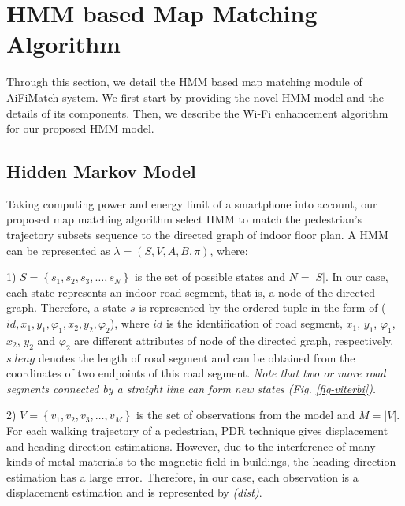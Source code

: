 \documentclass{llncs}
\begin{document}
\section{HMM based Map Matching Algorithm}

Through this section, we detail the HMM based map matching module of AiFiMatch system. We first start by providing the novel HMM model and the details of its components. Then, we describe the Wi-Fi enhancement algorithm for our proposed HMM model.

\subsection{Hidden Markov Model}

Taking computing power and energy limit of a smartphone into account, our proposed map matching algorithm select HMM to match the pedestrian's trajectory subsets sequence to the directed graph of indoor floor plan. A HMM can be represented as $\lambda  = (S,V,A,B,\pi)$, where:

1) $S = \left\{ {{s_1},{s_2},{s_3}, \ldots ,{s_N}} \right\}$ is the set of possible states and $N = \left| S \right|$. In our case, each state represents an indoor road segment, that is, a node of the directed graph. Therefore, a state $s$ is represented by the ordered tuple in the form of ($id,x_{1},y_{1},{\varphi}_{1},x_{2},y_{2},{\varphi}_{2}$), where $id$ is the identification of road segment, $x_{1}$, $y_{1}$, ${\varphi}_{1}$, $x_{2}$, $y_{2}$ and ${\varphi}_{2}$ are different attributes of node of the directed graph, respectively. $s.leng$ denotes the length of road segment and can be obtained from the coordinates of two endpoints of this road segment. \emph{Note that two or more road segments connected by a straight line can form new states (Fig. \ref{fig-viterbi}).}

2) $V = \left\{ {{v_1},{v_2},{v_3}, \ldots ,{v_M}} \right\}$ is the set of observations from the model and $M = \left| V \right|$. For each walking trajectory of a pedestrian, PDR technique gives displacement and heading direction estimations. However, due to the interference of many kinds of metal materials to the magnetic field in buildings, the heading direction estimation has a large error. Therefore, in our case, each observation is a displacement estimation and is represented by \emph{(dist)}.
\end{document}
